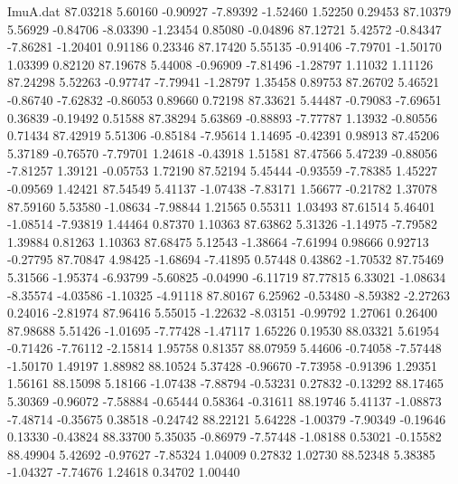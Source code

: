 \begin{filecontents}{ImuA.dat}
  87.03218    5.60160   -0.90927   -7.89392   -1.52460    1.52250    0.29453
  87.10379    5.56929   -0.84706   -8.03390   -1.23454    0.85080   -0.04896
  87.12721    5.42572   -0.84347   -7.86281   -1.20401    0.91186    0.23346
  87.17420    5.55135   -0.91406   -7.79701   -1.50170    1.03399    0.82120
  87.19678    5.44008   -0.96909   -7.81496   -1.28797    1.11032    1.11126
  87.24298    5.52263   -0.97747   -7.79941   -1.28797    1.35458    0.89753
  87.26702    5.46521   -0.86740   -7.62832   -0.86053    0.89660    0.72198
  87.33621    5.44487   -0.79083   -7.69651    0.36839   -0.19492    0.51588
  87.38294    5.63869   -0.88893   -7.77787    1.13932   -0.80556    0.71434
  87.42919    5.51306   -0.85184   -7.95614    1.14695   -0.42391    0.98913
  87.45206    5.37189   -0.76570   -7.79701    1.24618   -0.43918    1.51581
  87.47566    5.47239   -0.88056   -7.81257    1.39121   -0.05753    1.72190
  87.52194    5.45444   -0.93559   -7.78385    1.45227   -0.09569    1.42421
  87.54549    5.41137   -1.07438   -7.83171    1.56677   -0.21782    1.37078
  87.59160    5.53580   -1.08634   -7.98844    1.21565    0.55311    1.03493
  87.61514    5.46401   -1.08514   -7.93819    1.44464    0.87370    1.10363
  87.63862    5.31326   -1.14975   -7.79582    1.39884    0.81263    1.10363
  87.68475    5.12543   -1.38664   -7.61994    0.98666    0.92713   -0.27795
  87.70847    4.98425   -1.68694   -7.41895    0.57448    0.43862   -1.70532
  87.75469    5.31566   -1.95374   -6.93799   -5.60825   -0.04990   -6.11719
  87.77815    6.33021   -1.08634   -8.35574   -4.03586   -1.10325   -4.91118
  87.80167    6.25962   -0.53480   -8.59382   -2.27263    0.24016   -2.81974
  87.96416    5.55015   -1.22632   -8.03151   -0.99792    1.27061    0.26400
  87.98688    5.51426   -1.01695   -7.77428   -1.47117    1.65226    0.19530
  88.03321    5.61954   -0.71426   -7.76112   -2.15814    1.95758    0.81357
  88.07959    5.44606   -0.74058   -7.57448   -1.50170    1.49197    1.88982
  88.10524    5.37428   -0.96670   -7.73958   -0.91396    1.29351    1.56161
  88.15098    5.18166   -1.07438   -7.88794   -0.53231    0.27832   -0.13292
  88.17465    5.30369   -0.96072   -7.58884   -0.65444    0.58364   -0.31611
  88.19746    5.41137   -1.08873   -7.48714   -0.35675    0.38518   -0.24742
  88.22121    5.64228   -1.00379   -7.90349   -0.19646    0.13330   -0.43824
  88.33700    5.35035   -0.86979   -7.57448   -1.08188    0.53021   -0.15582
  88.49904    5.42692   -0.97627   -7.85324    1.04009    0.27832    1.02730
  88.52348    5.38385   -1.04327   -7.74676    1.24618    0.34702    1.00440

\end{filecontents}
